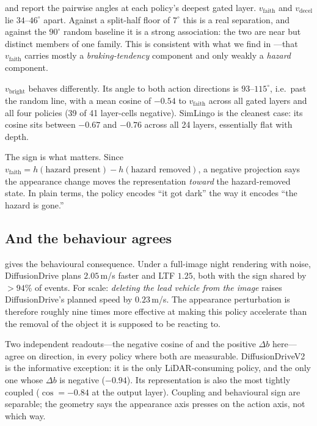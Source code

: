  and  report the pairwise angles at each policy's
deepest gated layer.
$v_{\mathrm{faith}}$ and $v_{\mathrm{decel}}$ lie $34$--$46^\circ$ apart. Against a split-half
floor of $7^\circ$ this is a real separation, and against the $90^\circ$ random baseline it is a
strong association: the two are near but distinct members of one family. This is consistent
with what we find in ---that $v_{\mathrm{faith}}$ carries mostly a
\emph{braking-tendency} component and only weakly a \emph{hazard} component.

$v_{\mathrm{bright}}$ behaves differently. Its angle to both action directions is
$93$--$115^\circ$, i.e.\ past the random line, with a mean cosine of $-0.54$ to
$v_{\mathrm{faith}}$ across all gated layers and all four policies (39 of 41 layer-cells
negative). SimLingo is the cleanest case: its cosine sits between $-0.67$ and $-0.76$ across all
24 layers, essentially flat with depth.

The sign is what matters. Since
$v_{\mathrm{faith}} = h(\text{hazard present}) - h(\text{hazard removed})$, a negative
projection says the appearance change moves the representation \emph{toward} the
hazard-removed state. In plain terms, the policy encodes ``it got dark'' the way it encodes
``the hazard is gone.''

\subsection{And the behaviour agrees}
\label{sec:behaviour}



 gives the behavioural consequence. Under a full-image night rendering with
noise, DiffusionDrive plans $2.05$\,m/s faster and LTF $1.25$, both with the sign shared by
$>94\%$ of events. For scale:
\emph{deleting the lead vehicle from the image} raises DiffusionDrive's planned speed by
$0.23$\,m/s. The appearance perturbation is therefore roughly nine times more effective at
making this policy accelerate than the removal of the object it is supposed to be reacting to.

Two independent readouts---the negative cosine of  and the positive
$\Delta b$ here---agree on direction, in every policy where both are measurable. DiffusionDriveV2
is the informative exception: it is the only LiDAR-consuming policy, and the only one whose
$\Delta b$ is negative ($-0.94$). Its representation is also the most tightly coupled
($\cos = -0.84$ at the output layer). Coupling and behavioural sign are separable; the geometry
says the appearance axis presses on the action axis, not which way.

